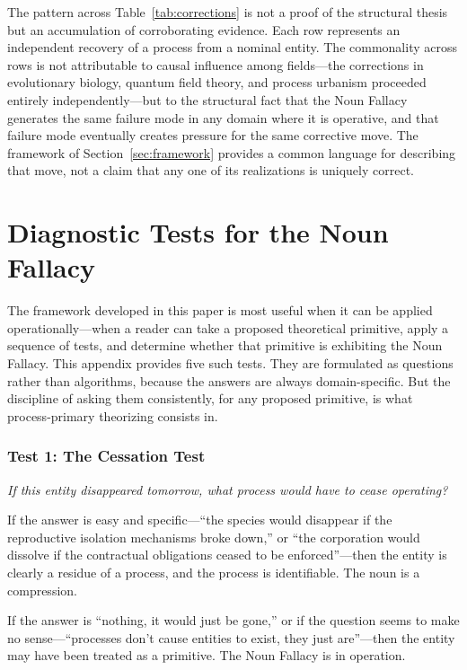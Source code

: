 \documentclass[12pt, a4paper]{article}
\theoremstyle{plain}
\theoremstyle{definition}
\theoremstyle{remark}
\begin{document}
The pattern across Table~\ref{tab:corrections} is not a proof of the structural
thesis but an accumulation of corroborating evidence. Each row represents an
independent recovery of a process from a nominal entity. The commonality
across rows is not attributable to causal influence among fields---the
corrections in evolutionary biology, quantum field theory, and process
urbanism proceeded entirely independently---but to the structural fact that
the Noun Fallacy generates the same failure mode in any domain where it is
operative, and that failure mode eventually creates pressure for the same
corrective move. The framework of Section~\ref{sec:framework} provides
a common language for describing that move, not a claim that any one
of its realizations is uniquely correct.

\section{Diagnostic Tests for the Noun Fallacy}
\label{app:diagnostic}

The framework developed in this paper is most useful when it can be applied
operationally---when a reader can take a proposed theoretical primitive,
apply a sequence of tests, and determine whether that primitive is exhibiting
the Noun Fallacy. This appendix provides five such tests. They are formulated
as questions rather than algorithms, because the answers are always
domain-specific. But the discipline of asking them consistently, for any
proposed primitive, is what process-primary theorizing consists in.

\subsubsection*{Test 1: The Cessation Test}

\textit{If this entity disappeared tomorrow, what process would have to cease
operating?}

If the answer is easy and specific---``the species would disappear if the
reproductive isolation mechanisms broke down,'' or ``the corporation would
dissolve if the contractual obligations ceased to be enforced''---then the
entity is clearly a residue of a process, and the process is identifiable.
The noun is a compression.

If the answer is ``nothing, it would just be gone,'' or if the question
seems to make no sense---``processes don't cause entities to exist, they
just are''---then the entity may have been treated as a primitive. The
Noun Fallacy is in operation.
\end{document}
